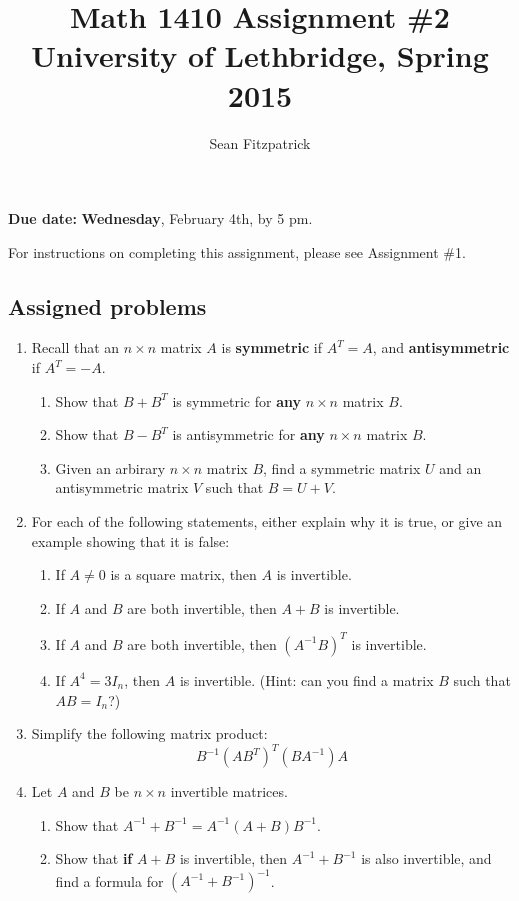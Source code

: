 \documentclass[letterpaper,12pt]{article}
\title{Math 1410 Assignment \#2\\University of Lethbridge, Spring 2015}
\author{Sean Fitzpatrick}
\begin{document}
 \maketitle

{\bf Due date:} {\bf Wednesday}, February 4th, by 5 pm.

\bigskip

For instructions on completing this assignment, please see Assignment \#1.
\subsection*{Assigned problems}
\begin{enumerate}

\item Recall that an $n\times n$ matrix $A$ is {\bf symmetric} if $A^T=A$, and {\bf antisymmetric} if $A^T=-A$.
\begin{enumerate}
 \item Show that $B+B^T$ is symmetric for {\bf any} $n\times n$ matrix $B$.
 \item Show that $B-B^T$ is antisymmetric for {\bf any} $n\times n$ matrix $B$.
 \item Given an arbirary $n\times n$ matrix $B$, find a symmetric matrix $U$ and an antisymmetric matrix $V$ such that $B=U+V$.
\end{enumerate}
\item For each of the following statements, either explain why it is true, or give an example showing that it is false:
\begin{enumerate}
 \item If $A\neq 0$ is a square matrix, then $A$ is invertible.
 \item If $A$ and $B$ are both invertible, then $A+B$ is invertible.
 \item If $A$ and $B$ are both invertible, then $(A^{-1}B)^T$ is invertible.
 \item If $A^4=3I_n$, then $A$ is invertible. (Hint: can you find a matrix $B$ such that $AB=I_n$?)
\end{enumerate}
\item Simplify the following matrix product:
\[
 B^{-1}(AB^T)^T(BA^{-1})A
\]
\item Let $A$ and $B$ be $n\times n$ invertible matrices.
\begin{enumerate}
 \item Show that $A^{-1}+B^{-1} = A^{-1}(A+B)B^{-1}$.
 \item Show that {\bf if} $A+B$ is invertible, then $A^{-1}+B^{-1}$ is also invertible, and find a formula for $(A^{-1}+B^{-1})^{-1}$.
\end{enumerate}


 \end{enumerate}
\end{document}
